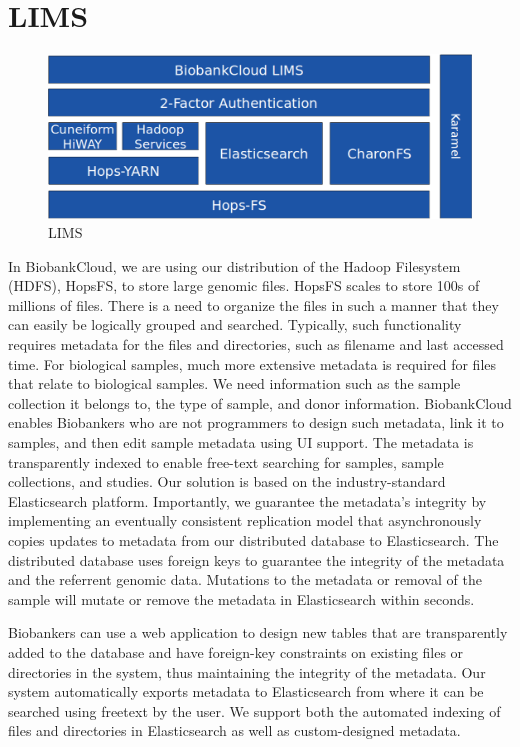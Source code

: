 \section{LIMS}

 \begin{figure}[h]
 \centering
 \includegraphics[width=\textwidth]{./imgs/stack.eps}
 \caption{LIMS}
 \label{fig:lim}
\end{figure}


In BiobankCloud, we are using our distribution of the Hadoop Filesystem (HDFS), HopsFS, to store large genomic files. HopsFS scales to store 100s of millions of files. There is a need to organize the files in such a manner that they can easily be logically grouped and searched. Typically, such functionality requires metadata for the files and directories, such as filename and last accessed time. For biological samples, much more extensive metadata is required for files that relate to biological samples. We need information such as the sample collection it belongs to, the type of sample, and donor information. BiobankCloud enables Biobankers who are not programmers to design such metadata, link it to samples, and then edit sample metadata using UI support. The metadata is transparently indexed to enable free-text searching for samples, sample collections, and studies. Our solution is based on the industry-standard Elasticsearch platform. Importantly, we guarantee the metadata's integrity by implementing an eventually consistent replication model that asynchronously copies updates to metadata from our distributed database to Elasticsearch. The distributed database uses foreign keys to guarantee the integrity of the metadata and the referrent genomic data. Mutations to the metadata or removal of the sample will mutate or remove the metadata in Elasticsearch within seconds.


Biobankers can use a web application to design new tables that are transparently added to the database and have foreign-key constraints on existing files or directories in the system, thus maintaining the integrity of the metadata. Our system automatically exports metadata to Elasticsearch from where it can be searched using freetext by the user. We support both the automated indexing of files and directories in Elasticsearch as well as custom-designed metadata.

